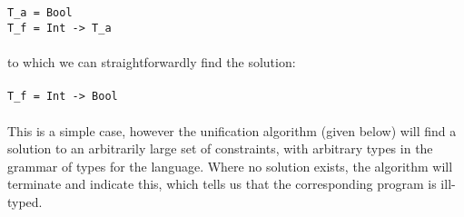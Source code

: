\documentclass{article}
\begin{document}
\\\\
\indent \texttt{T\_a = Bool} \\
\indent \texttt{T\_f = Int -> T\_a}
\\\\
to which we can straightforwardly find the solution:
\\\\
\indent \texttt{T\_f = Int -> Bool}
\\\\
This is a simple case, however the unification algorithm (given below) will find a solution to an arbitrarily large set of constraints, with arbitrary types in the grammar of types for the language. Where no solution exists, the algorithm will terminate and indicate this, which tells us that the corresponding program is ill-typed.
\pagebreak
\end{document}
